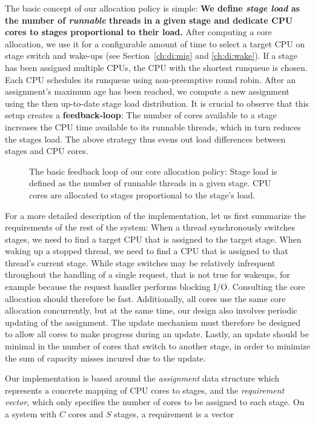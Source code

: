 \documentclass[12pt,a4paper]{book}
\begin{document}
The basic concept of our allocation policy is simple:
\textbf{We define \emph{stage load} as the number of \emph{runnable} threads in a given stage and dedicate CPU cores to stages proportional to their load.}
After computing a core allocation, we use it for a configurable amount of time  to select a target CPU on stage switch and wake-ups (see Section~\ref{ch:di:mig} and \ref{ch:di:wake}).
If a stage has been assigned multiple CPUs, the CPU with the shortest runqueue is chosen.
Each CPU schedules its runqueue using non-preemptive round robin. 
After an assignment's maximum age has been reached, we compute a new assignment using the then up-to-date stage load distribution.
It is crucial to observe that this setup creates a \textbf{feedback-loop}:
The number of cores available to a stage increases the CPU time available to its runnable threads, which in turn reduces the stages load.
The above strategy thus evens out load differences between stages and CPU cores. 

\begin{figure}[H]
    \caption{The basic feedback loop of our core allocation policy: Stage load is defined as the number of runnable threads in a given stage. CPU cores are allocated to stages proportional to the stage's load.}
\end{figure}

For a more detailed description of the implementation, let us first summarize the requirements of the rest of the system:
When a thread synchronously switches stages, we need to find a target CPU that is assigned to the target stage.
When waking up a stopped thread, we need to find a CPU that is assigned to that thread's current stage.
While stage switches may be relatively infrequent throughout the handling of a single request, that is not true for wakeups, for example because the request handler performs blocking I/O.
Consulting the core allocation should therefore be fast.
Additionally, all cores use the same core allocation concurrently, but at the same time, our design also involves periodic updating of the assignment.
The update mechanism must therefore be designed to allow all cores to make progress during an update.
Lastly, an update should be minimal in the number of cores that switch to another stage, in order to minimize the sum of capacity misses incured due to the update.

Our implementation is based around the \emph{assignment} data structure which represents a concrete mapping of CPU cores to stages, and the \emph{requirement vector}, which only specifies the number of cores to be assigned to each stage.
On a system with $C$ cores and $S$ stages, a requirement is a vector
\end{document}
